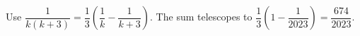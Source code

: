 Use $\dfrac{1}{k(k+3)}=\dfrac{1}{3}(\dfrac{1}{k}-\dfrac{1}{k+3})$. The sum telescopes to $\dfrac{1}{3}(1-\dfrac{1}{2023})=\boxed{\dfrac{674}{2023}}$.
